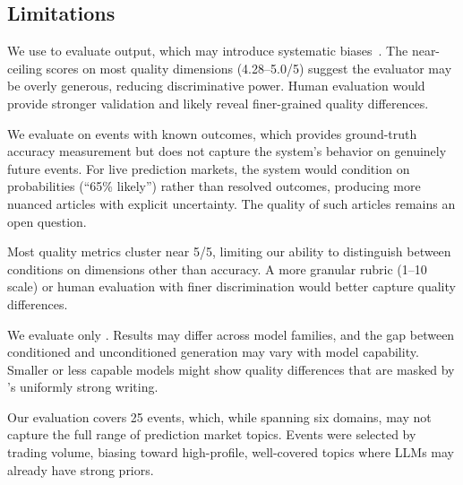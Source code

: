 \subsection{Limitations}
\label{sec:limitations}

 We use \gptfour to evaluate \gptfour output, which may introduce systematic biases~\citep{zheng2024judging}. The near-ceiling scores on most quality dimensions (4.28--5.0/5) suggest the evaluator may be overly generous, reducing discriminative power. Human evaluation would provide stronger validation and likely reveal finer-grained quality differences.

 We evaluate on events with known outcomes, which provides ground-truth accuracy measurement but does not capture the system's behavior on genuinely future events. For live prediction markets, the system would condition on probabilities (\eg ``65\% likely'') rather than resolved outcomes, producing more nuanced articles with explicit uncertainty. The quality of such articles remains an open question.

 Most quality metrics cluster near 5/5, limiting our ability to distinguish between conditions on dimensions other than accuracy. A more granular rubric (1--10 scale) or human evaluation with finer discrimination would better capture quality differences.

 We evaluate only \gptfour. Results may differ across model families, and the gap between conditioned and unconditioned generation may vary with model capability. Smaller or less capable models might show quality differences that are masked by \gptfour's uniformly strong writing.

 Our evaluation covers 25 events, which, while spanning six domains, may not capture the full range of prediction market topics. Events were selected by trading volume, biasing toward high-profile, well-covered topics where LLMs may already have strong priors.
